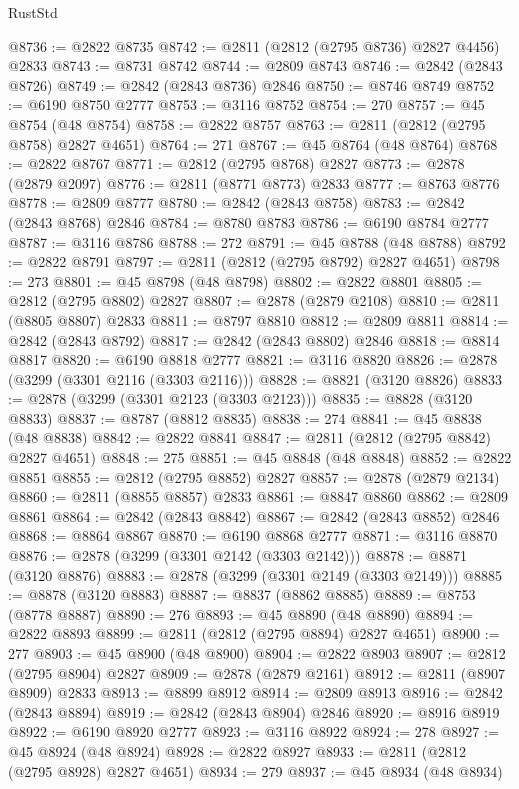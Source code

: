 \begin{lexlean}{RustStd}
\begin{coremodule}
@8736 := @2822 @8735
@8742 := @2811 (@2812 (@2795 @8736) @2827 @4456) @2833
@8743 := @8731 @8742
@8744 := @2809 @8743
@8746 := @2842 (@2843 @8726)
@8749 := @2842 (@2843 @8736) @2846
@8750 := @8746 @8749
@8752 := @6190 @8750 @2777
@8753 := @3116 @8752
@8754 := 270
@8757 := @45 @8754 (@48 @8754)
@8758 := @2822 @8757
@8763 := @2811 (@2812 (@2795 @8758) @2827 @4651)
@8764 := 271
@8767 := @45 @8764 (@48 @8764)
@8768 := @2822 @8767
@8771 := @2812 (@2795 @8768) @2827
@8773 := @2878 (@2879 @2097)
@8776 := @2811 (@8771 @8773) @2833
@8777 := @8763 @8776
@8778 := @2809 @8777
@8780 := @2842 (@2843 @8758)
@8783 := @2842 (@2843 @8768) @2846
@8784 := @8780 @8783
@8786 := @6190 @8784 @2777
@8787 := @3116 @8786
@8788 := 272
@8791 := @45 @8788 (@48 @8788)
@8792 := @2822 @8791
@8797 := @2811 (@2812 (@2795 @8792) @2827 @4651)
@8798 := 273
@8801 := @45 @8798 (@48 @8798)
@8802 := @2822 @8801
@8805 := @2812 (@2795 @8802) @2827
@8807 := @2878 (@2879 @2108)
@8810 := @2811 (@8805 @8807) @2833
@8811 := @8797 @8810
@8812 := @2809 @8811
@8814 := @2842 (@2843 @8792)
@8817 := @2842 (@2843 @8802) @2846
@8818 := @8814 @8817
@8820 := @6190 @8818 @2777
@8821 := @3116 @8820
@8826 := @2878 (@3299 (@3301 @2116 (@3303 @2116)))
@8828 := @8821 (@3120 @8826)
@8833 := @2878 (@3299 (@3301 @2123 (@3303 @2123)))
@8835 := @8828 (@3120 @8833)
@8837 := @8787 (@8812 @8835)
@8838 := 274
@8841 := @45 @8838 (@48 @8838)
@8842 := @2822 @8841
@8847 := @2811 (@2812 (@2795 @8842) @2827 @4651)
@8848 := 275
@8851 := @45 @8848 (@48 @8848)
@8852 := @2822 @8851
@8855 := @2812 (@2795 @8852) @2827
@8857 := @2878 (@2879 @2134)
@8860 := @2811 (@8855 @8857) @2833
@8861 := @8847 @8860
@8862 := @2809 @8861
@8864 := @2842 (@2843 @8842)
@8867 := @2842 (@2843 @8852) @2846
@8868 := @8864 @8867
@8870 := @6190 @8868 @2777
@8871 := @3116 @8870
@8876 := @2878 (@3299 (@3301 @2142 (@3303 @2142)))
@8878 := @8871 (@3120 @8876)
@8883 := @2878 (@3299 (@3301 @2149 (@3303 @2149)))
@8885 := @8878 (@3120 @8883)
@8887 := @8837 (@8862 @8885)
@8889 := @8753 (@8778 @8887)
@8890 := 276
@8893 := @45 @8890 (@48 @8890)
@8894 := @2822 @8893
@8899 := @2811 (@2812 (@2795 @8894) @2827 @4651)
@8900 := 277
@8903 := @45 @8900 (@48 @8900)
@8904 := @2822 @8903
@8907 := @2812 (@2795 @8904) @2827
@8909 := @2878 (@2879 @2161)
@8912 := @2811 (@8907 @8909) @2833
@8913 := @8899 @8912
@8914 := @2809 @8913
@8916 := @2842 (@2843 @8894)
@8919 := @2842 (@2843 @8904) @2846
@8920 := @8916 @8919
@8922 := @6190 @8920 @2777
@8923 := @3116 @8922
@8924 := 278
@8927 := @45 @8924 (@48 @8924)
@8928 := @2822 @8927
@8933 := @2811 (@2812 (@2795 @8928) @2827 @4651)
@8934 := 279
@8937 := @45 @8934 (@48 @8934)

\end{coremodule}
\end{lexlean}

